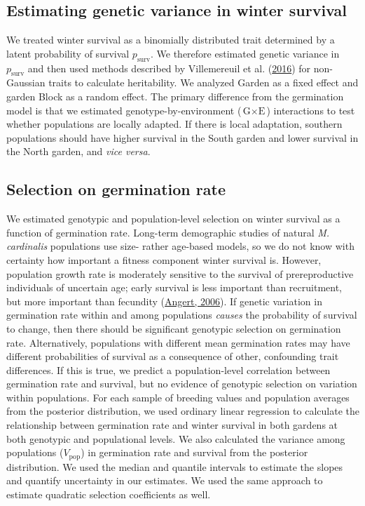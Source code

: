 \documentclass[
  12pt,
]{article}
\begin{document}
\hypertarget{estimating-genetic-variance-in-winter-survival}{%
\subsection{Estimating genetic variance in winter survival}\label{estimating-genetic-variance-in-winter-survival}}

We treated winter survival as a binomially distributed trait determined by a latent probability of survival \(p_\text{surv}\). We therefore estimated genetic variance in \(p_\text{surv}\) and then used methods described by Villemereuil et al. (\protect\hyperlink{ref-de_villemereuil_general_2016}{2016}) for non-Gaussian traits to calculate heritability. We analyzed Garden as a fixed effect and garden Block as a random effect. The primary difference from the germination model is that we estimated genotype-by-environment (\(\text{G}\times\text{E}\)) interactions to test whether populations are locally adapted. If there is local adaptation, southern populations should have higher survival in the South garden and lower survival in the North garden, and \emph{vice versa}.

\hypertarget{selection-on-germination-rate}{%
\subsection{Selection on germination rate}\label{selection-on-germination-rate}}

We estimated genotypic and population-level selection on winter survival as a function of germination rate. Long-term demographic studies of natural \emph{M. cardinalis} populations use size- rather age-based models, so we do not know with certainty how important a fitness component winter survival is. However, population growth rate is moderately sensitive to the survival of prereproductive individuals of uncertain age; early survival is less important than recruitment, but more important than fecundity (\protect\hyperlink{ref-angert_demography_2006}{Angert, 2006}). If genetic variation in germination rate within and among populations \emph{causes} the probability of survival to change, then there should be significant genotypic selection on germination rate. Alternatively, populations with different mean germination rates may have different probabilities of survival as a consequence of other, confounding trait differences. If this is true, we predict a population-level correlation between germination rate and survival, but no evidence of genotypic selection on variation within populations. For each sample of breeding values and population averages from the posterior distribution, we used ordinary linear regression to calculate the relationship between germination rate and winter survival in both gardens at both genotypic and populational levels. We also calculated the variance among populations (\(V_\text{pop}\)) in germination rate and survival from the posterior distribution. We used the median and quantile intervals to estimate the slopes and quantify uncertainty in our estimates. We used the same approach to estimate quadratic selection coefficients as well.
\end{document}

